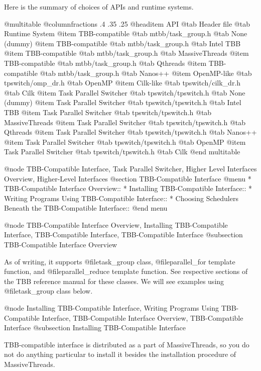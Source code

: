 Here is the summary of choices of APIs and runtime systems.

@multitable @columnfractions .4 .35 .25
@headitem API            @tab Header file       @tab Runtime System 
@item     TBB-compatible @tab mtbb/task_group.h @tab None (dummy)
@item     TBB-compatible @tab mtbb/task_group.h @tab Intel TBB 
@item     TBB-compatible @tab mtbb/task_group.h @tab MassiveThreads
@item     TBB-compatible @tab mtbb/task_group.h @tab Qthreads
@item     TBB-compatible @tab mtbb/task_group.h @tab Nanos++
@item     OpenMP-like    @tab tpswitch/omp_dr.h          @tab OpenMP
@item     Cilk-like      @tab tpswitch/cilk_dr.h         @tab Cilk
@item     Task Parallel Switcher @tab tpswitch/tpswitch.h @tab None (dummy)
@item     Task Parallel Switcher @tab tpswitch/tpswitch.h @tab Intel TBB 
@item     Task Parallel Switcher @tab tpswitch/tpswitch.h @tab MassiveThreads
@item     Task Parallel Switcher @tab tpswitch/tpswitch.h @tab Qthreads
@item     Task Parallel Switcher @tab tpswitch/tpswitch.h @tab Nanos++
@item     Task Parallel Switcher @tab tpswitch/tpswitch.h @tab OpenMP
@item     Task Parallel Switcher @tab tpswitch/tpswitch.h @tab Cilk
@end multitable

@node TBB-Compatible Interface, Task Parallel Switcher, Higher Level Interfaces Overview, Higher-Level Interfaces
@section TBB-Compatible Interface
@menu
* TBB-Compatible Interface Overview::
* Installing TBB-Compatible Interface::
* Writing Programs Using TBB-Compatible Interface::
* Choosing Schedulers Beneath the TBB-Compatible Interface::
@end menu

@node TBB-Compatible Interface Overview, Installing TBB-Compatible Interface, TBB-Compatible Interface, TBB-Compatible Interface
@subsection TBB-Compatible Interface Overview

As of writing, it supports @file{task_group} class, @file{parallel_for}
template function, and @file{parallel_reduce} template function.  See
respective sections of the TBB reference manual for these classes.
We will see examples using @file{task_group} class below.

@node Installing TBB-Compatible Interface, Writing Programs Using TBB-Compatible Interface, TBB-Compatible Interface Overview, TBB-Compatible Interface
@subsection Installing TBB-Compatible Interface

TBB-compatible interface is distributed as a part of MassiveThreads, so
you do not do anything particular to install it besides the installation
procedure of MassiveThreads.

